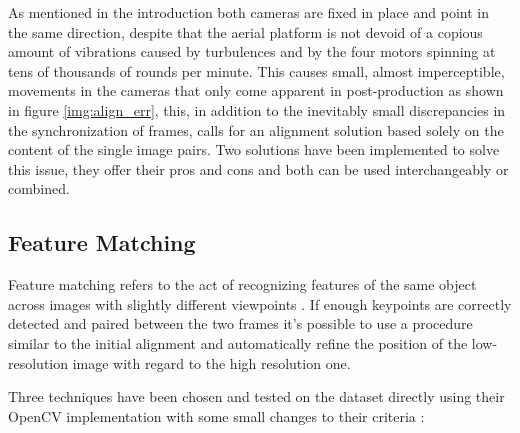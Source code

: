 As mentioned in the introduction both cameras are fixed in place and point in the same direction, despite that the aerial platform is not devoid of a copious amount of vibrations caused by turbulences and by the four motors spinning at tens of thousands of rounds per minute.
This causes small, almost imperceptible, movements in the cameras that only come apparent in post-production as shown in figure \ref{img:align_err}, this, in addition to the inevitably small discrepancies in the synchronization of frames, calls for an alignment solution based solely on the content of the single image pairs. Two solutions have been implemented to solve this issue, they offer their pros and cons and both can be used interchangeably or combined.


\subsection {Feature Matching}
\label{subsec:feature_match}

Feature matching refers to the act of recognizing features of the same object across images with slightly different viewpoints \cite{feat_match}. If enough keypoints are correctly detected and paired between the two frames it's possible to use a procedure similar to the initial alignment and automatically refine the position of the low-resolution image with regard to the high resolution one.

Three techniques have been chosen and tested on the dataset directly using their OpenCV implementation with some small changes to their criteria \cite{6126544, lowe1999object, 6809191, DBLP:journals/corr/abs-1710-02726}:

